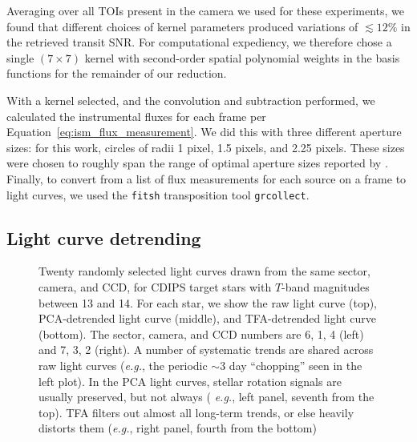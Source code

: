 \documentclass[12pt,twocolumn,tighten,trackchanges]{aastex62}
\begin{document}
Averaging over all TOIs present in the camera we used for these
experiments, we found that different choices of kernel parameters
produced variations of $\lesssim 12\%$ in the retrieved transit SNR.
For computational expediency, we therefore chose a single $(7\times
7)$ kernel with second-order spatial polynomial weights in the basis
functions for the remainder of our reduction.

With a kernel selected, and the convolution and subtraction performed,
we calculated the instrumental fluxes for each frame per
Equation~\ref{eq:ism_flux_measurement}.  We did this with three
different aperture sizes: for this work, circles of radii 1 pixel, 1.5
pixels, and 2.25 pixels.  These sizes were chosen to roughly span the
range of optimal aperture sizes reported by
\citet{Sullivan_et_al_2015}.  Finally, to convert from a list of flux
measurements for each source on a frame to light curves, we used the
\texttt{fitsh} transposition tool \texttt{grcollect}.

\subsection{Light curve detrending}
\label{subsec:lcdetrending}

\begin{figure}[!t]
	\vspace{-0.85cm}
	\caption{
    Twenty randomly selected light curves drawn from the same sector,
    camera, and CCD, for CDIPS target stars with $T$-band magnitudes
    between 13 and 14.  For each star, we show the raw light curve
    (top), PCA-detrended light curve (middle), and TFA-detrended light
    curve (bottom).  The sector, camera, and CCD numbers are 6, 1, 4
    (left) and 7, 3, 2 (right).  A number of systematic trends are
    shared across raw light curves ({\it e.g.}, the periodic $\sim$3 day
    ``chopping'' seen in the left plot).  In the PCA light curves,
    stellar rotation signals are usually preserved, but not always ({\it
    e.g.}, left panel, seventh from the top).  TFA filters out almost
    all long-term trends, or else heavily distorts them ({\it e.g.},
    right panel, fourth from the bottom)
	\label{fig:lc_systematics_dtr}
	}
\end{figure}
\end{document}
